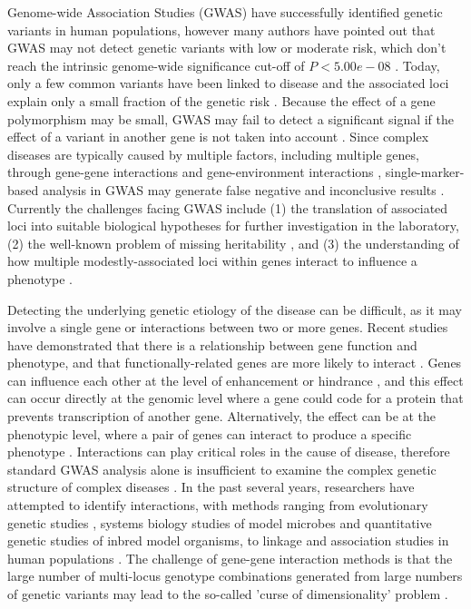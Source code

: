 \documentclass[10pt]{article}
\begin{document}
Genome-wide Association Studies (GWAS) have successfully identified genetic variants in human populations, however many authors have pointed out that GWAS may not detect genetic variants with low or moderate risk, which don't reach the intrinsic genome-wide significance cut-off of $P < 5.00e-08$ \cite{peng,ott,rita}. Today, only a few common variants have been linked to disease and the associated loci explain only a small fraction of the genetic risk \cite{rita,ott,wu3,wu4,wu5,wu6}. Because the effect of a gene polymorphism may be small, GWAS may fail to detect a significant signal if the effect of a variant in another gene is not taken into account \cite{rita,wum,wuka,wu3,wu4,wu5,wu6}. Since complex diseases are typically caused by multiple factors, including multiple genes, through gene-gene interactions and gene-environment interactions \cite{wum,wuka,wu3,wu4,wu5,wu6}, single-marker-based analysis in GWAS may generate false negative and inconclusive results \cite{peng,jia,ott}. Currently the challenges facing GWAS include (1) the translation of associated loci into suitable biological hypotheses for further investigation in the laboratory, (2) the well-known problem of missing heritability \cite{manio}, and (3) the understanding of how multiple modestly-associated loci within genes interact to influence a phenotype \cite{peng,jia,rita}. 

Detecting the underlying genetic etiology of the disease can be difficult, as it may involve a single gene or interactions between two or more genes. Recent studies have demonstrated that there is a relationship between gene function and phenotype, and that functionally-related genes are more likely to interact \cite{peng,jia,ott,philp,wuka,wu3,wu4,wu5,wu6}. Genes can influence each other at the level of enhancement or hindrance \cite{philp}, and this effect can occur directly at the genomic level where a gene could code for a protein that prevents transcription of another gene. Alternatively, the effect can be at the phenotypic level, where a pair of genes can interact to produce a specific phenotype \cite{ott,philp,wuhr,barazi}. Interactions can play critical roles in the cause of disease, therefore standard GWAS analysis alone is insufficient to examine the complex genetic structure of complex diseases \cite{barazi}. In the past several years, researchers have attempted to identify interactions, with methods ranging from evolutionary genetic studies \cite{philp,kimur}, systems biology studies of model microbes \cite{segre} and quantitative genetic studies of inbred model organisms, to linkage \cite{iong} and association studies in human populations \cite{wum,wu6,wu5,wu4,wu3,wuka,wuhr}. The challenge of gene-gene interaction methods is that the large number of multi-locus genotype combinations generated from large numbers of genetic variants may lead to the so-called 'curse of dimensionality' problem \cite{bellm}. 
\end{document}
